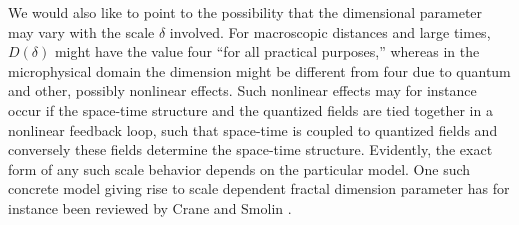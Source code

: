 We would also like to point to the possibility
that the dimensional parameter may vary with the scale $\delta$ involved.
For macroscopic distances and large times, $D(\delta )$ might have the value four ``for all practical purposes,''
whereas in the microphysical domain
the dimension might be different from four due to quantum and
other, possibly nonlinear effects.
Such nonlinear effects may for instance occur if the space-time structure and the quantized fields
are tied together in a nonlinear feedback loop, such that space-time is coupled to quantized fields
and conversely these fields determine the space-time structure.
Evidently, the exact form of any such scale behavior depends on the particular model.
One such concrete model giving rise to scale dependent fractal dimension parameter has for instance
been reviewed by Crane and Smolin  \cite{crane-smolin}.





%
%





